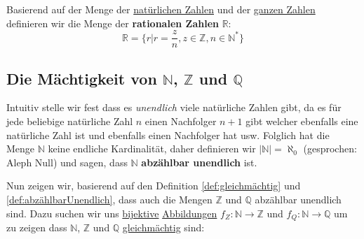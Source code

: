 \documentclass[../../main.tex]{subfiles}
\begin{document}
		\begin{definition}
			\label{def:RationaleZahlen}
			Basierend auf der Menge der \hyperref[def:NatürlicheZahlen]{natürlichen Zahlen} und der \hyperref[def:GanzeZahlen]{ganzen Zahlen} definieren wir die Menge der \textbf{rationalen Zahlen} $\mathbb{R}$: $$\mathbb{R} = \{r | r = \frac{z}{n}, z \in \mathbb{Z}, n \in \mathbb{N}^* \}$$
		\end{definition}
	
	

		
		
		\subsection*{Die Mächtigkeit von $\mathbb{N}$, $\mathbb{Z}$ und $\mathbb{Q}$}
		\begin{definition}
			\label{def:abzählbarUnendlich}
			Intuitiv stelle wir fest dass es \textit{unendlich} viele natürliche Zahlen gibt, da es für jede beliebige natürliche Zahl $n$ einen Nachfolger $n+1$ gibt welcher ebenfalls eine natürliche Zahl ist und ebenfalls einen Nachfolger hat usw. Folglich hat die Menge $\mathbb{N}$ keine endliche Kardinalität, daher definieren wir $|\mathbb{N}|=\aleph_0$ (gesprochen: Aleph Null) und sagen, dass $\mathbb{N}$ \textbf{abzählbar unendlich} ist. 
		\end{definition}
		
		Nun zeigen wir, basierend auf den Definition \ref{def:gleichmächtig} und \ref{def:abzählbarUnendlich}, dass auch die Mengen $\mathbb{Z}$ und $\mathbb{Q}$ abzählbar unendlich sind. Dazu suchen wir uns \hyperref[def:Bijektiv]{bijektive} \hyperref[def:Abbildung]{Abbildungen} $f_Z: \mathbb{N} \rightarrow \mathbb{Z}$ und $f_Q: \mathbb{N} \rightarrow \mathbb{Q}$ um zu zeigen dass $\mathbb{N}$, $\mathbb{Z}$ und $\mathbb{Q}$ \hyperref[def:gleichmächtig]{gleichmächtig} sind:
		
\end{document}
